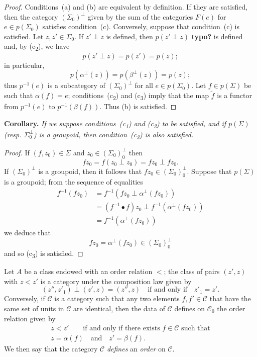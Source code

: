 \documentclass[a4paper,oneside,nobib,nofonts,notitlepage,notoc,nols,fleqn,justified]{tufte-book}
\newenvironment{itenv}[1]
  {\phantomsection\par\medskip\noindent\textbf{#1.}\itshape}
  {\par\medskip}
\newcommand{\oldpage}[1]{{\reversemarginpar\marginnote{\raggedleft\footnotesize\textit{p.~#1}}}}
\newcommand{\unsure}[1]{{\color{purple}\textbf{#1}}}
\newcommand{\CC}{\mathcal{C}}
\begin{document}
\begin{proof}
  Conditions~(a) and (b) are equivalent by definition.
  If they are satisfied, then the category $(\Sigma_0)^\perp$ given by the sum of the categories $F(e)$ for $e\in p(\Sigma_0)$ satisfies condition~(c).
  Conversely, suppose that condition~(c) is satisfied.
  Let $z,z'\in\Sigma_0$.
  If $z'\perp z$ is defined, then $p(z'\perp z)$ \unsure{typo?} is defined and, by (c\textsubscript{2}), we have
  \[
    p(z'\perp z)
    = p(z')
    = p(z);
  \]
  in particular,
  \[
    p(\alpha^\perp(z))
    = p(\beta^\perp(z))
    = p(z);
  \]
  thus $p^{-1}(e)$ is a subcategory of $(\Sigma_0)^\perp$ for all $e\in p(\Sigma_0)$.
  Let $f\in p(\Sigma)$ be such that $\alpha(f)=e$;
  conditions~(c\textsubscript{2}) and (c\textsubscript{3}) imply that the map $\widetilde{f}$ is a functor from $p^{-1}(e)$ to $p^{-1}(\beta(f))$.
  Thus (b) is satisfied.
\end{proof}

\begin{itenv}{Corollary}
  If we suppose conditions~(c\textsubscript{1}) and (c\textsubscript{2}) to be satisfied, and if $p(\Sigma)$ (resp. $\Sigma_0^\perp$) is a groupoid, then condition~(c\textsubscript{3}) is also satisfied.
\end{itenv}

\begin{proof}
  If $(f,z_0)\in\Sigma$ and $z_0\in(\Sigma_0)_0^\perp$ then
  \[
    fz_0
    = f(z_0\perp z_0)
    =fz_0\perp fz_0.
  \]
  If $(\Sigma_0)^\perp$ is a groupoid, then it follows that $fz_0\in(\Sigma_0)_0^\perp$.
  Suppose that $p(\Sigma)$ is a groupoid;
  from the sequence of equalities
  \[
    \begin{aligned}
      f^{-1}(fz_0)
      &= f^{-1}(fz_0\perp\alpha^\perp(fz_0))
    \\&= (f^{-1}\bullet f)z_0\perp f^{-1}(\alpha^\perp(fz_0))
    \\&= f^{-1}(\alpha^\perp(fz_0))
    \end{aligned}
  \]
  we deduce that
  \[
    fz_0
    = \alpha^\perp(fz_0)
    \in(\Sigma_0)_0^\perp
  \]
  and so (c\textsubscript{3}) is satisfied.
\end{proof}

Let $A$ be a class endowed with an order relation $<$;
the class of pairs $(z',z)$ with $z<z'$ is a category under the composition law given by
\[
  (z'',z'_1)\perp(z',z)
  =(z'',z)
  \quad\text{if and only if}\quad
  z'_1=z'.
\]
\oldpage{356}
Conversely, if $\CC$ is a category such that any two elements $f,f'\in\CC$ that have the same set of units in $\CC$ are identical, then the data of $\CC$ defines on $\CC_0$ the order relation given by
\[
  \begin{gathered}
    z<z'
    \qquad\text{if and only if there exists $f\in\CC$ such that}
  \\z=\alpha(f)
    \quad\text{and}\quad
    z'=\beta(f).
  \end{gathered}
\]
We then say that the category $\CC$ \emph{defines} an \emph{order} on $\CC$.
\end{document}
